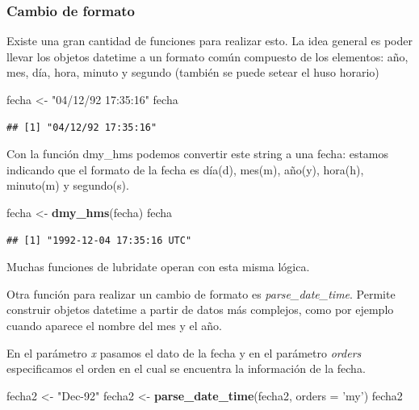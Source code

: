 \documentclass[]{book}
\newenvironment{Shaded}{\begin{snugshade}}{\end{snugshade}}
\newcommand{\DataTypeTok}[1]{\textcolor[rgb]{0.13,0.29,0.53}{#1}}
\newcommand{\KeywordTok}[1]{\textcolor[rgb]{0.13,0.29,0.53}{\textbf{#1}}}
\newcommand{\NormalTok}[1]{#1}
\newcommand{\StringTok}[1]{\textcolor[rgb]{0.31,0.60,0.02}{#1}}
\begin{document}
\hypertarget{cambio-de-formato}{%
\subsubsection{Cambio de formato}\label{cambio-de-formato}}

Existe una gran cantidad de funciones para realizar esto. La idea general es poder llevar los objetos datetime a un formato común compuesto de los elementos: año, mes, día, hora, minuto y segundo (también se puede setear el huso horario)

\begin{Shaded}
\begin{Highlighting}[]
\NormalTok{fecha  <-}\StringTok{ "04/12/92 17:35:16"}
\NormalTok{fecha}
\end{Highlighting}
\end{Shaded}

\begin{verbatim}
## [1] "04/12/92 17:35:16"
\end{verbatim}

Con la función dmy\_hms podemos convertir este string a una fecha: estamos indicando que el formato de la fecha es día(d), mes(m), año(y), hora(h), minuto(m) y segundo(s).

\begin{Shaded}
\begin{Highlighting}[]
\NormalTok{fecha  <-}\StringTok{ }\KeywordTok{dmy_hms}\NormalTok{(fecha)}
\NormalTok{fecha}
\end{Highlighting}
\end{Shaded}

\begin{verbatim}
## [1] "1992-12-04 17:35:16 UTC"
\end{verbatim}

Muchas funciones de lubridate operan con esta misma lógica.

Otra función para realizar un cambio de formato es \emph{parse\_date\_time}. Permite construir objetos datetime a partir de datos más complejos, como por ejemplo cuando aparece el nombre del mes y el año.

En el parámetro \emph{x} pasamos el dato de la fecha y en el parámetro \emph{orders} especificamos el orden en el cual se encuentra la información de la fecha.

\begin{Shaded}
\begin{Highlighting}[]
\NormalTok{fecha2  <-}\StringTok{ "Dec-92"}
\NormalTok{fecha2 <-}\StringTok{ }\KeywordTok{parse_date_time}\NormalTok{(fecha2, }\DataTypeTok{orders =} \StringTok{'my'}\NormalTok{)}
\NormalTok{fecha2}
\end{Highlighting}
\end{Shaded}
\end{document}
